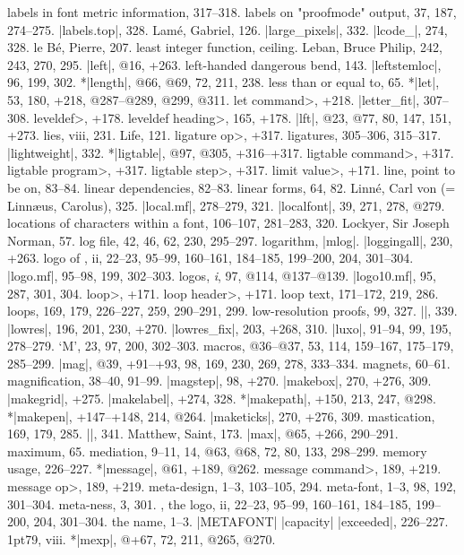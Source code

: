 labels in font metric information, 317--318.
labels on "proofmode" output, 37, 187, 274--275.
|labels.top|, 328.
Lam\'e, Gabriel, 126.
|large_pixels|, 332.
|lcode_|, 274, 328.
le B\'e, Pierre, 207.
least integer function, \see ceiling.
Leban, Bruce Philip, 242, 243, 270, 295.
|left|, @16, +263.
left-handed dangerous bend, 143.
|leftstemloc|, 96, 199, 302.
*|length|, @66, @69, 72, 211, 238.
less than or equal to, 65.
*|let|, 53, 180, +218, @287--@289, @299, @311.
\<let command>, +218.
|letter_fit|, 307--308.
\<leveldef>, +178.
\<leveldef heading>, 165, +178.
|lft|, @23, @77, 80, 147, 151, +273.
lies, viii, 231.
Life, 121.
\<ligature op>, +317.
ligatures, 305--306, 315--317.
|lightweight|, 332.
*|ligtable|, @97, @305, +316--+317.
\<ligtable command>, +317.
\<ligtable program>, +317.
\<ligtable step>, +317.
\<limit value>, +171.
line, point to be on, 83--84.
linear dependencies, 82--83.
linear forms, 64, 82.
Linn\'e, Carl von (= Linn\ae us, Carolus), 325.
|local.mf|, 278--279, 321.
|localfont|, 39, 271, 278, @279.
locations of characters within a font, 106--107, 281--283, 320.
Lockyer, Sir Joseph Norman, 57.
log file, 42, 46, 62, 230, 295--297.
logarithm, \see |mlog|.
|loggingall|, 230, +263.
logo of \MF, ii, 22--23, 95--99, 160--161, 184--185, 199--200, 204, 301--304.
|logo.mf|, 95--98, 199, 302--303.
logos, {\it i},  97, @114, @137--@139.
|logo10.mf|, 95, 287, 301, 304.
\<loop>, +171.
\<loop header>, +171.
loop text, 171--172, 219, 286.
loops, 169, 179, 226--227, 259, 290--291, 299.
low-resolution proofs, 99, 327.
|\lowers|, 339.
|lowres|, 196, 201, 230, +270.
|lowres_fix|, 203, +268, 310.
|luxo|, 91--94, 99, 195, 278--279.
\newletter
`M', 23, 97, 200, 302--303.
macros, @36--@37, 53, 114, 159--167, 175--179, 285--299.
|mag|, @39, +91--+93, 98, 169, 230, 269, 278, 333--334.
magnets, 60--61.
magnification, 38--40, 91--99.
|magstep|, 98, +270.
|makebox|, 270, +276, 309.
|makegrid|, +275.
|makelabel|, +274, 328.
*|makepath|, +150, 213, 247, @298.
*|makepen|, +147--+148, 214, @264.
|maketicks|, 270, +276, 309.
mastication, 169, 179, 285.
|\math|, 341.
Matthew, Saint, 173.
|max|, @65, +266, 290--291.
maximum, 65.
mediation, 9--11, 14, @63, @68, 72, 80, 133, 298--299.
memory usage, 226--227.
*|message|, @61, +189, @262.
\<message command>, 189, +219.
\<message op>, 189, +219.
meta-design, 1--3, 103--105, 294.
meta-font, 1--3, 98, 192, 301--304.
meta-ness, 3, 301.
\MF, the logo, ii, 22--23, 95--99, 160--161, 184--185, 199--200,
 204, 301--304.
\sub the name, 1--3.
|METAFONT| |capacity| |exceeded|, 226--227.
\MF\kern1pt79, viii.
*|mexp|, @+67, 72, 211, @265, @270.
